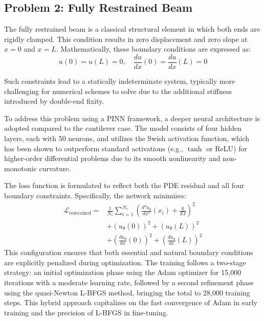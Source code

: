 \documentclass[twocolumn]{svjour3}
\begin{document}
	\subsection{Problem 2: Fully Restrained Beam}
	
	The fully restrained beam is a classical structural element in which both ends are rigidly clamped. This condition results in zero displacement and zero slope at $x=0$ and $x=L$. Mathematically, these boundary conditions are expressed as:
	\begin{equation}
		u(0) = u(L) = 0, \quad \frac{du}{dx}(0) = \frac{du}{dx}(L) = 0
				\label{eq:115}
	\end{equation}

	Such constraints lead to a statically indeterminate system, typically more challenging for numerical schemes to solve due to the additional stiffness introduced by double-end fixity.
	
	To address this problem using a PINN framework, a deeper neural architecture is adopted compared to the cantilever case. The model consists of four hidden layers, each with 50 neurons, and utilizes the Swish activation function, which has been shown to outperform standard activations (e.g., $\tanh$ or ReLU) for higher-order differential problems due to its smooth nonlinearity and non-monotonic curvature.
	
	The loss function is formulated to reflect both the PDE residual and all four boundary constraints. Specifically, the network minimizes:
	\begin{equation}
	\begin{split}
		\mathcal{L}_{\text{restrained}} = & \frac{1}{N_c}\sum_{i=1}^{N_c} \left( \frac{d^4u_\theta}{dx^4}(x_i) + \frac{q}{EI} \right)^2 \\
		& + \left(u_\theta(0)\right)^2 + \left(u_\theta(L)\right)^2 \\
		& + \left(\frac{du_\theta}{dx}(0)\right)^2 + \left(\frac{du_\theta}{dx}(L)\right)^2
	\end{split}
		\label{eq:116}
	\end{equation}
	This configuration ensures that both essential and natural boundary conditions are explicitly penalized during optimization. The training follows a two-stage strategy: an initial optimization phase using the Adam optimizer for 15,000 iterations with a moderate learning rate, followed by a second refinement phase using the quasi-Newton L-BFGS method, bringing the total to 28,000 training steps. This hybrid approach capitalizes on the fast convergence of Adam in early training and the precision of L-BFGS in fine-tuning.
	
\end{document}
